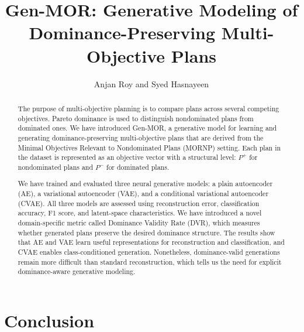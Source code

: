 \documentclass[runningheads]{llncs}
\begin{document}
%
\title{Gen-MOR: Generative Modeling of Dominance-Preserving Multi-Objective Plans
}
%
\author{Anjan Roy and Syed Hasnayeen}
%
\maketitle
%
\begin{abstract}
The purpose of multi-objective planning is to compare plans across several competing objectives. Pareto dominance is used to distinguish nondominated plans from dominated ones. We have introduced Gen-MOR, a generative model for learning and generating dominance-preserving multi-objective plans that are derived from the Minimal Objectives Relevant to Nondominated Plans (MORNP) setting. Each plan in the dataset is represented as an objective vector with a structural level: $P^{+}$ for nondominated plans and $P^{-}$ for dominated plans.

We have trained and evaluated three neural generative models: a plain autoencoder (AE), a variational autoencoder (VAE), and a conditional variational autoencoder (CVAE). All three models are assessed using reconstruction error, classification accuracy, F1 score, and latent-space characteristics. We have introduced a novel domain-specific metric called Dominance Validity Rate (DVR), which measures whether generated plans preserve the desired dominance structure. The results show that AE and VAE learn useful representations for reconstruction and classification, and CVAE enables class-conditioned generation. Nonetheless, dominance-valid generations remain more difficult than standard reconstruction, which tells us the need for explicit dominance-aware generative modeling. 

\end{abstract}
%

%

%

%

%

%

%

%

%

%

%

%

%

%
\section{Conclusion}
\label{sec:conclusion}
\end{document}
